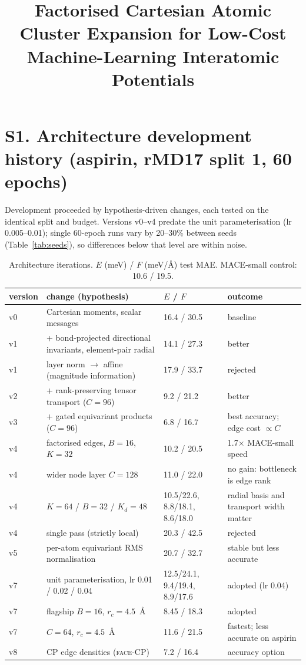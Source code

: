 \documentclass[journal=jctcce,manuscript=suppinfo,layout=traditional]{achemso}
\author{\AuthorName}
\affiliation{\AuthorAffiliation}
\title{Factorised Cartesian Atomic Cluster Expansion for Low-Cost Machine-Learning Interatomic Potentials}
\newcommand{\FACE}{\textsc{face}}
\begin{document}
\section*{S1. Architecture development history (aspirin, rMD17 split 1, 60 epochs)}
Development proceeded by hypothesis-driven changes, each tested on the identical split and budget. Versions v0--v4
predate the unit parameterisation (lr 0.005--0.01); single 60-epoch runs vary by 20--30\% between seeds
(Table~\ref{tab:seeds}), so differences below that level are within noise.

\begin{table}[h]
\caption{Architecture iterations. $E$ (meV) / $F$ (meV/\AA) test MAE. MACE-small control: 10.6 / 19.5.}
\label{tab:history}
\small\setlength{\tabcolsep}{3pt}
\begin{tabular}{lp{5.6cm}p{2.9cm}p{3.2cm}}
\toprule
version & change (hypothesis) & $E$ / $F$ & outcome \\
\midrule
v0 & Cartesian moments, scalar messages & 16.4 / 30.5 & baseline \\
v1 & + bond-projected directional invariants, element-pair radial & 14.1 / 27.3 & better \\
v1 & layer norm $\to$ affine (magnitude information) & 17.9 / 33.7 & rejected \\
v2 & + rank-preserving tensor transport ($C=96$) & 9.2 / 21.2 & better \\
v3 & + gated equivariant products ($C=96$) & 6.8 / 16.7 & best accuracy; edge cost $\propto C$ \\
v4 & factorised edges, $B=16$, $K=32$ & 10.2 / 20.5 & 1.7$\times$ MACE-small speed \\
v4 & wider node layer $C=128$ & 11.0 / 22.0 & no gain: bottleneck is edge rank \\
v4 & $K=64$ / $B=32$ / $K_d=48$ & 10.5/22.6, 8.8/18.1, 8.6/18.0 & radial basis and transport width matter \\
v4 & single pass (strictly local) & 20.3 / 42.5 & rejected \\
v5 & per-atom equivariant RMS normalisation & 20.7 / 32.7 & stable but less accurate \\
v7 & unit parameterisation, lr 0.01 / 0.02 / 0.04 & 12.5/24.1, 9.4/19.4, 8.9/17.6 & adopted (lr 0.04) \\
v7 & flagship $B=16$, $r_c=4.5$~\AA & 8.45 / 18.3 & adopted \\
v7 & $C=64$, $r_c=4.5$~\AA & 11.6 / 21.5 & fastest; less accurate on aspirin \\
v8 & CP edge densities (\FACE-CP) & 7.2 / 16.4 & accuracy option \\
\bottomrule
\end{tabular}
\end{table}
\end{document}
